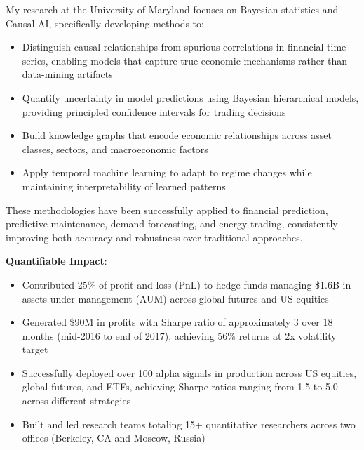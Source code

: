 \documentclass[11pt, letterpaper]{article}
\begin{document}
  My research at the University of Maryland focuses on Bayesian statistics and
  Causal AI, specifically developing methods to:

  \begin{itemize}
    \item Distinguish causal relationships from spurious correlations in
      financial time series, enabling models that capture true economic
      mechanisms rather than data-mining artifacts

    \item Quantify uncertainty in model predictions using Bayesian hierarchical
      models, providing principled confidence intervals for trading decisions

    \item Build knowledge graphs that encode economic relationships across
      asset classes, sectors, and macroeconomic factors

    \item Apply temporal machine learning to adapt to regime changes while
      maintaining interpretability of learned patterns
  \end{itemize}

  These methodologies have been successfully applied to financial prediction,
  predictive maintenance, demand forecasting, and energy trading, consistently
  improving both accuracy and robustness over traditional approaches.

  \textbf{Quantifiable Impact}:

  \begin{itemize}
    \item Contributed 25\% of profit and loss (PnL) to hedge funds managing
      \$1.6B in assets under management (AUM) across global futures and
      US equities

    \item Generated \$90M in profits with Sharpe ratio of approximately 3
      over 18 months (mid-2016 to end of 2017), achieving 56\% returns at
      2x volatility target

    \item Successfully deployed over 100 alpha signals in production across
      US equities, global futures, and ETFs, achieving Sharpe ratios ranging
      from 1.5 to 5.0 across different strategies

    \item Built and led research teams totaling 15+ quantitative researchers
      across two offices (Berkeley, CA and Moscow, Russia)
  \end{itemize}
\end{document}
